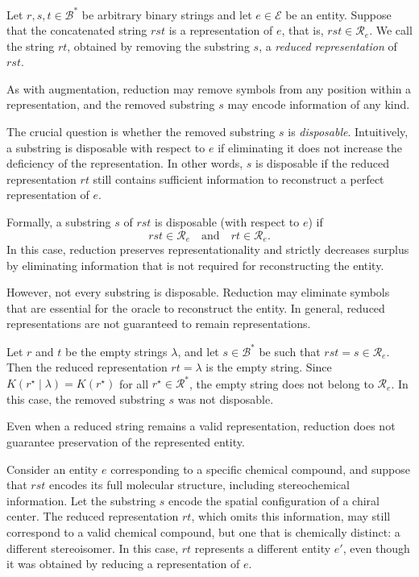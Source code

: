 \begin{definition}
Let $r, s, t \in \mathcal{B}^*$ be arbitrary binary strings and let $e \in \mathcal{E}$ be an entity. Suppose that the concatenated string $rst$ is a representation of $e$, that is, $rst \in \mathcal{R}_{e}$. We call the string $rt$, obtained by removing the substring $s$, a \emph{reduced representation} of $rst$.
\end{definition}

As with augmentation, reduction may remove symbols from any position within a representation, and the removed substring $s$ may encode information of any kind.

The crucial question is whether the removed substring $s$ is \emph{disposable}. Intuitively, a substring is disposable with respect to $e$ if eliminating it does not increase the deficiency of the representation. In other words, $s$ is disposable if the reduced representation $rt$ still contains sufficient information to reconstruct a perfect representation of $e$.

Formally, a substring $s$ of $rst$ is disposable (with respect to $e$) if
\[
rst \in \mathcal{R}_e
\quad\text{and}\quad
rt \in \mathcal{R}_e.
\]
In this case, reduction preserves representationality and strictly decreases surplus by eliminating information that is not required for reconstructing the entity.

However, not every substring is disposable. Reduction may eliminate symbols that are essential for the oracle to reconstruct the entity. In general, reduced representations are not guaranteed to remain representations.

\begin{example}
Let $r$ and $t$ be the empty strings $\lambda$, and let $s \in \mathcal{B}^*$ be such that $rst = s \in \mathcal{R}_{e}$. Then the reduced representation $rt = \lambda$ is the empty string. Since $K(r^{\star} \mid \lambda) = K(r^{\star})$ for all $r^{\star} \in \mathcal{R}^\ast$, the empty string does not belong to $\mathcal{R}_e$. In this case, the removed substring $s$ was not disposable.
\end{example}

Even when a reduced string remains a valid representation, reduction does not guarantee preservation of the represented entity.

\begin{example}
Consider an entity $e$ corresponding to a specific chemical compound, and suppose that $rst$ encodes its full molecular structure, including stereochemical information. Let the substring $s$ encode the spatial configuration of a chiral center. The reduced representation $rt$, which omits this information, may still correspond to a valid chemical compound, but one that is chemically distinct: a different stereoisomer. In this case, $rt$ represents a different entity $e'$, even though it was obtained by reducing a representation of $e$.
\end{example}

